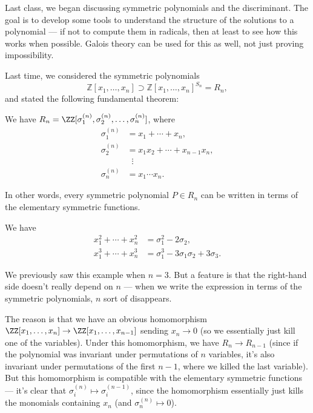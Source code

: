 Last class, we began discussing symmetric polynomials and the discriminant. The goal is to develop some tools to understand the structure of the solutions to a polynomial --- if not to compute them in radicals, then at least to see how this works when possible. Galois theory can be used for this as well, not just proving impossibility. 

Last time, we considered the symmetric polynomials \[\mathbb{Z}[x_1, \ldots, x_n] \supset \mathbb{Z}[x_1, \ldots, x_n]^{S_n} = R_n,\] and stated the following fundamental theorem:

\begin{theorem} \label{fundamental thm of sym poly}
    We have $R_n = \ZZ[\sigma_1^{(n)}, \sigma_2^{(n)}, \ldots, \sigma_n^{(n)}]$, where \begin{align*}
        \sigma_1^{(n)} &= x_1 + \cdots + x_n, \\
        \sigma_2^{(n)} &= x_1x_2 + \cdots + x_{n - 1}x_n, \\
        &\;\; \vdots \\
        \sigma_n^{(n)} &= x_1\cdots x_n.
    \end{align*}
\end{theorem}

In other words, every symmetric polynomial $P \in R_n$ can be written in terms of the elementary symmetric functions. 

\begin{example} \label{power sums example}
    We have 
    \begin{align*}
        x_1^2 + \cdots + x_n^2 &= \sigma_1^2 - 2\sigma_2, \\
        x_1^3 + \cdots + x_n^3 &= \sigma_1^3 - 3\sigma_1\sigma_2 + 3\sigma_3. 
    \end{align*}
\end{example}

We previously saw this example when $n = 3$. But a feature is that the right-hand side doesn't really depend on $n$ --- when we write the expression in terms of the symmetric polynomials, $n$ sort of disappears. 

The reason is that we have an obvious homomorphism $\ZZ[x_1, \ldots, x_n] \to \ZZ[x_1, \ldots, x_{n - 1}]$ sending $x_n \to 0$ (so we essentially just kill one of the variables). Under this homomorphism, we have $R_n \to R_{n - 1}$ (since if the polynomial was invariant under permutations of $n$ variables, it's also invariant under permutations of the first $n - 1$, where we killed the last variable). But this homomorphism is compatible with the elementary symmetric functions --- it's clear that $\sigma_i^{(n)} \mapsto \sigma_i^{(n - 1)}$, since the homomorphism essentially just kills the monomials containing $x_n$ (and $\sigma_n^{(n)} \mapsto 0$). 

